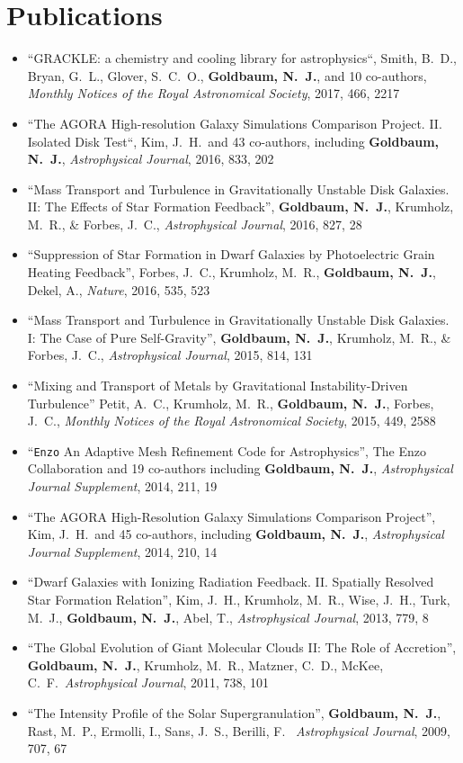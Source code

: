 \documentclass[10pt,letterpaper]{article}
\begin{document}
\section*{Publications}

\begin{itemize}
  \item[] ``GRACKLE: a chemistry and cooling library for astrophysics``, Smith,
    B.~D., Bryan, G.~L., Glover, S.~C.~O., {\bf Goldbaum, N.~J.}, and 10
    co-authors, {\it Monthly Notices of the Royal Astronomical Society}, 2017,
    466, 2217
  \item[] ``The AGORA High-resolution Galaxy Simulations Comparison
    Project. II. Isolated Disk Test``, Kim, J.~H.\ and 43 co-authors, including
    {\bf Goldbaum, N.~J.}, {\it Astrophysical Journal}, 2016, 833, 202
  \item[] ``Mass Transport and Turbulence in Gravitationally Unstable Disk Galaxies. II:
    The Effects of Star Formation Feedback'', {\bf Goldbaum, N.~J.}, Krumholz, M.~R., \& Forbes,
    J.~C., {\it Astrophysical Journal}, 2016, 827, 28
  \item[] ``Suppression of Star Formation in Dwarf Galaxies by Photoelectric
    Grain Heating Feedback'', Forbes, J.~C., Krumholz, M.~R., {\bf Goldbaum,
      N.~J.}, Dekel, A., {\it Nature}, 2016, 535, 523
  \item[] ``Mass Transport and Turbulence in Gravitationally Unstable Disk Galaxies. I:
    The Case of Pure Self-Gravity'', {\bf Goldbaum, N.~J.}, Krumholz, M.~R., \& Forbes,
    J.~C., {\it Astrophysical Journal}, 2015, 814, 131
  \item [] ``Mixing and Transport of Metals by Gravitational Instability-Driven
    Turbulence'' Petit, A.~C., Krumholz,
    M.~R., {\bf Goldbaum, N.~J.}, Forbes, J.~C., {\it Monthly Notices of
      the Royal Astronomical Society}, 2015, 449, 2588
  \item[] ``\texttt{Enzo} An Adaptive Mesh Refinement Code for Astrophysics'', The
    Enzo Collaboration and 19 co-authors including {\bf Goldbaum, N.~J.}, {\it
      Astrophysical Journal Supplement}, 2014, 211, 19
  \item[] ``The AGORA High-Resolution Galaxy Simulations Comparison Project'',
    Kim, J.~H.\ and 45 co-authors, including {\bf Goldbaum, N.~J.}, {\it
      Astrophysical Journal Supplement}, 2014, 210, 14
  \item[] ``Dwarf Galaxies with Ionizing Radiation Feedback. II. Spatially
    Resolved Star Formation Relation'', Kim, J.~H., Krumholz, M.~R., Wise,
    J.~H., Turk, M.~J., {\bf Goldbaum, N.~J.}, Abel, T., {\it Astrophysical Journal},
    2013, 779, 8
  \item[] ``The Global Evolution of Giant Molecular Clouds II: The Role of
    Accretion'', {\bf Goldbaum, N.~J.}, Krumholz, M.~R., Matzner, C.~D., McKee,
    C.~F.\ {\it Astrophysical Journal}, 2011, 738, 101
  \item[] ``The Intensity Profile of the Solar Supergranulation'', {\bf Goldbaum,
      N.~J.}, Rast, M.~P., Ermolli, I., Sans, J.~S., Berilli, F.\ {\it
      Astrophysical Journal}, 2009, 707, 67

\end{itemize}
\end{document}
